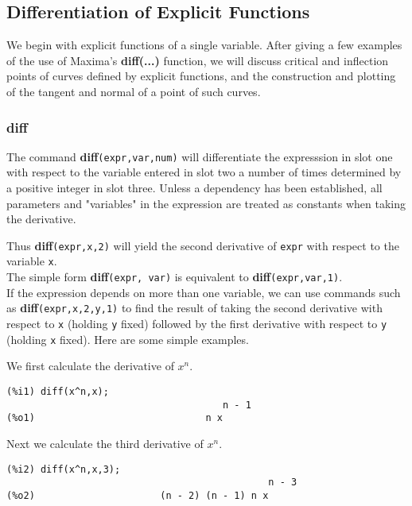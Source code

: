 \documentclass[12pt]{article}
\begin{document}
\subsection{Differentiation of Explicit Functions}
We begin with explicit functions of a single variable.
After giving a few examples of the use of Maxima's \textbf{diff(...)} function,
  we will discuss critical and inflection points of curves defined by
  explicit functions, and the construction and plotting of the tangent and
  normal of a point of such curves.


\subsubsection{diff}
The command \textbf{diff}\verb|(expr,var,num)| will differentiate the expresssion 
  in slot one with respect to the variable entered in slot two a number of times
  determined by a positive integer in slot three.
Unless a dependency has been established, all parameters and "variables" in the
  expression are treated as constants when taking the derivative.  
  
Thus \textbf{diff}\verb|(expr,x,2)| will yield the second derivative of \verb|expr|
  with respect to the variable \verb|x|.\\

\smallskip
The simple form \textbf{diff}\verb|(expr, var)| is equivalent to \textbf{diff}\verb|(expr,var,1)|.\\  

If the expression depends on more than one variable, we can use commands such as
  \textbf{diff}\verb|(expr,x,2,y,1)| to find the result of taking the second
  derivative with respect to \verb|x| (holding \verb|y| fixed) followed by the first derivative with
  respect to \verb|y| (holding \verb|x| fixed).
Here are some simple examples.\\
\smallskip

We first calculate the derivative of $x^{n}$.
\small
\begin{verbatim}
(%i1) diff(x^n,x);
                                      n - 1
(%o1)                              n x
\end{verbatim}
\normalsize

Next we calculate the third derivative of $x^{n}$.
\small
\begin{verbatim}
(%i2) diff(x^n,x,3);
                                              n - 3
(%o2)                      (n - 2) (n - 1) n x
\end{verbatim}
\normalsize
\end{document}
